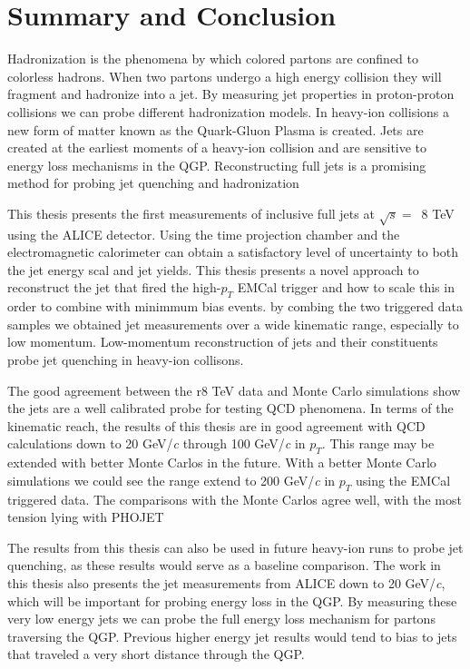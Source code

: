 \section{Summary and Conclusion}

Hadronization is the phenomena by which colored partons are confined to colorless hadrons.  When two partons undergo a high energy collision they will fragment and hadronize into a jet.  By measuring jet properties in proton-proton collisions we can probe different hadronization models.  In heavy-ion collisions a new form of matter known as the Quark-Gluon Plasma is created.  Jets are created at the earliest moments of a heavy-ion collision and are sensitive to energy loss mechanisms in the QGP.  Reconstructing full jets is a promising method for probing jet quenching and hadronization

This thesis presents the first measurements of inclusive full jets at $\sqrt{s} = \,$ 8 TeV using the ALICE detector.  Using the time projection chamber and the electromagnetic calorimeter can obtain a satisfactory level of uncertainty to both the jet energy scal and jet yields.  This thesis presents a novel approach to reconstruct the jet that fired the high-$p_{T}$ EMCal trigger and how to scale this in order to combine with minimmum bias events.  by combing the two triggered data samples we obtained jet measurements over a wide kinematic range, especially to low momentum.  Low-momentum reconstruction of jets and their constituents probe jet quenching in heavy-ion collisons.

The good agreement between the r8 TeV data and Monte Carlo simulations show the jets are a well calibrated probe for testing QCD phenomena.  In terms of the kinematic reach, the results of this thesis are in good agreement with QCD calculations down to 20 GeV/\textit{c} through 100 GeV/\textit{c} in $p_{T}$.  This range may be extended with better Monte Carlos in the future.  With a better Monte Carlo simulations we could see the range extend to 200 GeV/\textit{c} in $p_{T}$ using the EMCal triggered data.  The comparisons with the Monte Carlos agree well, with the most tension lying with PHOJET

The results from this thesis can also be used in future heavy-ion runs to probe jet quenching, as these results would serve as a baseline comparison.  The work in this thesis also presents the jet measurements from ALICE down to 20 GeV/\textit{c}, which will be important for probing energy loss in the QGP.  By measuring these very low energy jets we can probe the full energy loss mechanism for partons traversing the QGP.  Previous higher energy jet results would tend to bias to jets that traveled a very short distance through the QGP.

